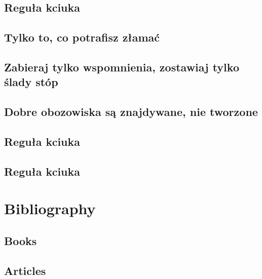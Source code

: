\documentclass[11pt,fleqn]{book} %
\begin{document}
\section{Reguła kciuka}\label{regula-kciuka}
\section{Tylko to, co potrafisz złamać}\label{regula-drewno}
\section{Zabieraj tylko wspomnienia, zostawiaj tylko ślady stóp}\label{regula-zabierz-zostaw}
\section{Dobre obozowiska są znajdywane, nie tworzone}\label{regula-dobre-obozowiska}
\section{Reguła kciuka}\label{regula-kciuka}
\section{Reguła kciuka}\label{regula-kciuka}



\chapter*{Bibliography}
\section*{Books}
\printbibliography[heading=bibempty,type=book]
\section*{Articles}
\printbibliography[heading=bibempty,type=article]


\cleardoublepage
{}
\setlength{\columnsep}{0.75cm}
\printindex

\end{document}
